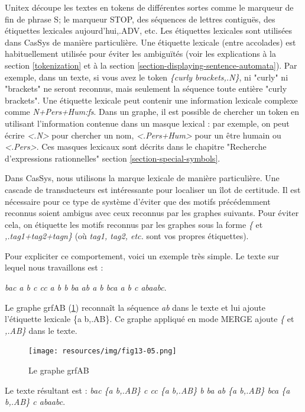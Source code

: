 \bigskip
\noindent Unitex découpe les textes en tokens de différentes sortes comme le marqueur de fin de
phrase {S}; le marqueur {STOP}, des séquences de lettres contiguës, des étiquettes lexicales
{aujourd'hui,.ADV}, etc. Les étiquettes lexicales sont utilisées dans CasSys de manière
particulière. Une étiquette lexicale (entre accolades) est habituellement utilisée pour éviter les
ambiguïtés (voir les explications à la section \ref{tokenization} et à la section
\ref{section-displaying-sentence-automata}). 
Par exemple, dans un texte, si vous avez le token \emph{\{curly brackets,.N\}}, ni "curly" ni
"brackets" ne seront reconnus, mais seulement la séquence toute entière
"curly brackets". Une étiquette lexicale peut contenir une information lexicale complexe comme
\emph{N+Pers+Hum:fs}.
Dans un graphe, il est possible de chercher un token en utilisant l'information contenue dans un
masque lexical : par exemple, on peut écrire \emph{<.N>} pour chercher 
un nom, \emph{<.Pers+Hum>} pour un être humain ou \emph{<.Pers>}. Ces masques lexicaux sont décrits
dans le chapitre "Recherche d'expressions rationnelles" section
\ref{section-special-symbols}.
 
\bigskip
\noindent Dans CasSys, nous utilisons la marque lexicale de manière particulière. Une cascade de
transducteurs est intéressante pour localiser un îlot de certitude. Il est nécessaire pour ce type
de système d'éviter que des motifs précédemment reconnus soient ambigus avec ceux reconnus par les
graphes suivants. Pour éviter cela, on étiquette les motifs reconnus par les graphes sous la forme
\emph{\{} et \emph{,.tag1+tag2+tagn\}} (où \emph{tag1, tag2, etc.} sont vos propres étiquettes).

\bigskip
\noindent Pour expliciter ce comportement, voici un exemple très simple. Le texte sur lequel nous
travaillons est :

\emph{bac a b c cc a b b ba ab a b bca a b c abaabc}.

\bigskip
\noindent Le graphe grfAB (\ref{fig13-05}) reconnaît la séquence \emph{ab} dans le texte et lui
ajoute l'étiquette lexicale \{a b,.AB\}. Ce graphe appliqué en mode MERGE ajoute \emph{\{ } et
 \emph{,.AB\}} dans le texte.

\begin{figure}[!htb]
  \centering
  \texttt{[image: resources/img/fig13-05.png]}
  \caption{Le graphe grfAB}
  \label{fig13-05}
\end{figure}

\bigskip
\noindent Le texte résultant est : \emph{bac \{a b,.AB\} c cc \{a b,.AB\} b ba ab \{a b,.AB\} bca
\{a b,.AB\} c abaabc}.

